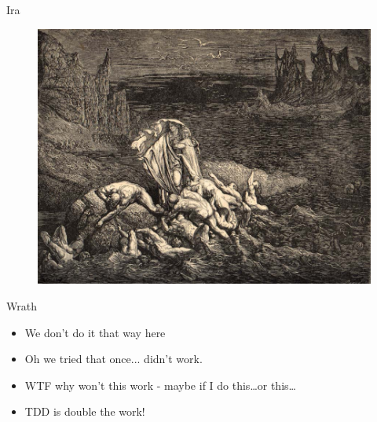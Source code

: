 \documentclass[12pt,xcolor=x11names]{beamer}
\begin{document}
\begin{frame}{Ira}
    \begin{figure}
        \centering \includegraphics[height=0.75\textheight]{images/wrath.jpg}
    \end{figure}
\end{frame}
\begin{frame}{Wrath}
    \begin{itemize}
        \item We don't do it that way here
        \item Oh we tried that once... didn't work.
        \item WTF why won't this work - maybe if I do this\ldots or this\ldots
        \item TDD is double the work!
    \end{itemize}
\end{frame}
\end{document}
